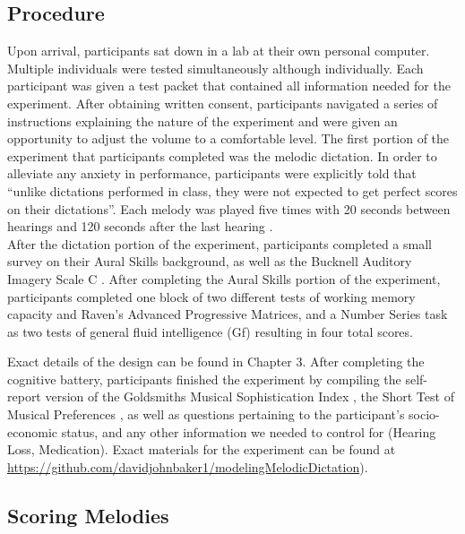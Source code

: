\documentclass[12pt,]{book}
\begin{document}
\hypertarget{procedure-1}{%
\subsection{Procedure}\label{procedure-1}}

Upon arrival, participants sat down in a lab at their own personal computer.
Multiple individuals were tested simultaneously although individually.
Each participant was given a test packet that contained all information needed for the experiment.
After obtaining written consent, participants navigated a series of instructions explaining the nature of the experiment and were given an opportunity to adjust the volume to a comfortable level.
The first portion of the experiment that participants completed was the melodic dictation.
In order to alleviate any anxiety in performance, participants were explicitly told that ``unlike dictations performed in class, they were not expected to get perfect scores on their dictations''.
Each melody was played five times with 20 seconds between hearings and 120 seconds after the last hearing \citep{paneyEffectDirectingAttention2016}.\\
After the dictation portion of the experiment, participants completed a small survey on their Aural Skills background, as well as the Bucknell Auditory Imagery Scale C \citep{halpernDifferencesAuditoryImagery2015}.
After completing the Aural Skills portion of the experiment, participants completed one block of two different tests of working memory capacity \citep{unsworthAutomatedVersionOperation2005} and Raven's Advanced Progressive Matrices, and a Number Series task as two tests of general fluid intelligence (Gf) \citep{ravenManualRavenProgressive1994, thurstonePrimaryMentalAbilities1938} resulting in four total scores.

Exact details of the design can be found in Chapter 3.
After completing the cognitive battery, participants finished the experiment by compiling the self-report version of the Goldsmiths Musical Sophistication Index \citep{mullensiefenMusicalityNonMusiciansIndex2014}, the Short Test of Musical Preferences \citep{rentfrowReMiEveryday2003}, as well as questions pertaining to the participant's socio-economic status, and any other information we needed to control for (Hearing Loss, Medication). Exact materials for the experiment can be found at \url{https://github.com/davidjohnbaker1/modelingMelodicDictation}).

\hypertarget{scoring-melodies}{%
\subsection{Scoring Melodies}\label{scoring-melodies}}
\end{document}
